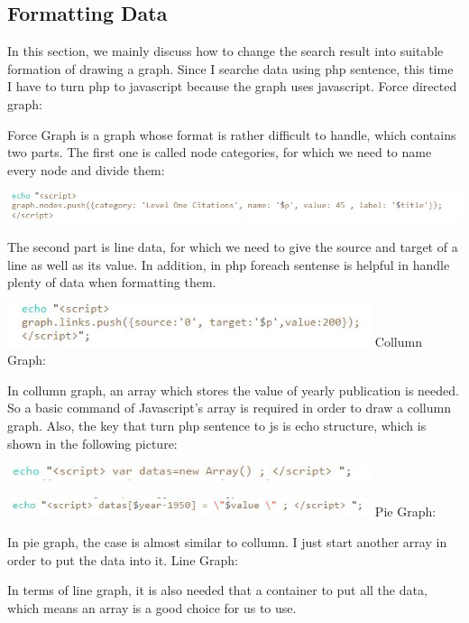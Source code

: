 \documentclass[10pt,twoside,a4paper,titlepage]{article}
\begin{document}
	\subsection{Formatting Data}
		\par In this section, we mainly discuss how to change the search result into suitable formation of drawing a graph. Since I searche data using php sentence, this time I have to turn php to javascript because the graph uses javascript. \newline \newline
		Force directed graph: \par Force Graph is a graph whose format is rather difficult to handle, which contains two parts. The first one is called node categories, for which we need to name every node and divide them: \par
		\includegraphics[width=1.0\textwidth]{gjl/03.jpg}\par
		The second part is line data, for which we need to give the source and target of a line as well as its value. In addition, in php foreach sentense is helpful in handle plenty of data when formatting them.\par
		\includegraphics[width=0.8\textwidth]{gjl/04.jpg}\newline
		Collumn Graph:\par In collumn graph, an array which stores the value of yearly publication is needed. So a basic command of Javascript's array is required in order to draw a collumn graph. Also, the key that turn php sentence to js is echo structure, which is shown in the following picture: \par
		\includegraphics[width=0.8\textwidth]{gjl/01.jpg}\par
		\includegraphics[width=0.8\textwidth]{gjl/02.jpg}\newline
		Pie Graph: \par In pie graph, the case is almost similar to collumn. I just start another array in order to put the data into it. \newline\newline
		Line Graph:\par In terms of line graph, it is also needed that a container to put all the data, which means an array is a good choice for us to use.\newline
		
\end{document}
